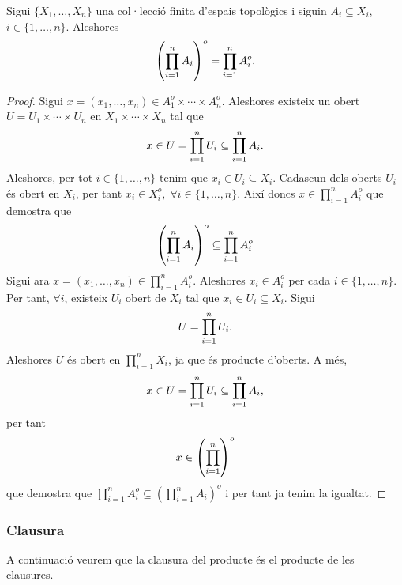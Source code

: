 \documentclass[../main.tex]{subfiles}
\begin{document}
\begin{ter}
\label{ter:interiorespaiproducte} Sigui $\{X_1,\ldots,X_n\}$ una col·lecció finita d'espais topològics i siguin $A_i\subseteq X_i$, $i\in\{1,\ldots,n\}$. Aleshores
\begin{equation}
    \notag
    \left(\prod_{i=1}^n A_i\right)^{o} = \prod_{i=1}^n A_i^{o}.
\end{equation}
\end{ter}
\begin{proof}
Sigui $x = (x_1,\ldots,x_n)\in A_1^{o}\times\cdots\times A_n^{o}$. Aleshores existeix un obert $U = U_1\times \cdots\times U_n$ en $X_1\times \cdots\times X_n$ tal que
\begin{equation}
    \notag
    x\in U = \prod_{i=1}^n U_i\subseteq\prod_{i=1}^n A_i .
\end{equation}
Aleshores, per tot $i\in\{1,\ldots,n\}$ tenim que $x_i\in U_i\subseteq X_i$. Cadascun dels oberts $U_i$ és obert en $X_i$, per tant $x_i\in X_i^{o},\;\forall i\in\{1,\ldots,n\}$. Així doncs $x\in\prod_{i=1}^n A_i^{o}$ que demostra que 
\begin{equation}
    \notag
    \left(\prod_{i=1}^n A_i\right)^{o}\subseteq\prod_{i=1}^n A_i^{o}
\end{equation}
Sigui ara $x = (x_1,\ldots,x_n)\in \prod_{i=1}^n A_i^{o}$. Aleshores $x_i\in A_i^{o}$ per cada $i\in\{1,\ldots,n\}$. Per tant, $\forall i$, existeix $U_i$ obert de $X_i$ tal que $x_i\in U_i\subseteq X_i$. Sigui
\begin{equation}
    \notag
    U = \prod_{i=1}^n U_i.
\end{equation}
Aleshores $U$ és obert en $\prod_{i=1}^n X_i$, ja que és producte d'oberts. A més, 
\begin{equation}
    \notag
    x\in U = \prod_{i=1}^n U_i\subseteq \prod_{i=1}^n A_i,
\end{equation}
per tant
\begin{equation}
    \notag
    x\in\left(\prod_{i=1}^n\right)^{o}
\end{equation}
que demostra que $\prod_{i=1}^n A_i^{o}\subseteq\left(\prod_{i=1}^n A_i\right)^{o}$ i per tant ja tenim la igualtat.
\end{proof}

\subsubsection{Clausura}
A continuació veurem que la clausura del producte és el producte de les clausures.
\end{document}
